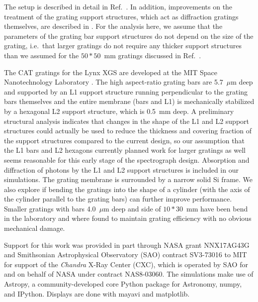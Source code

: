 \documentclass[]{spie}  %
\begin{document}
The setup is described in detail in Ref.~. In addition, improvements on the treatment of the grating support structures, which act as diffraction gratings themselves, are described in \cite{10.1117/12.2525814}. For the analysis here, we assume that the parameters of the grating bar support structures do not depend on the size of the grating, i.e.\ that larger gratings do not require any thicker support structures than we assumed for the $50*50$~mm gratings discussed in Ref.~.

The CAT gratings for the Lynx XGS are developed at the
MIT Space Nanotechnology Laboratory
\cite{Heilmann:11,doi:10.1117/12.2188525,10.1117/12.2314180,10.1117/12.2529354}. The high aspect-ratio grating bars are
5.7~$\mu$m deep and supported by an L1 support structure running
perpendicular to the grating bars themselves and the entire membrane
(bars and L1) is mechanically stabilized by a hexagonal L2 support
structure, which is 0.5~mm deep. 
A preliminary structural analysis indicates that changes in the shape of the L1 and L2 support structures could actually be used to reduce the thickness and covering fraction of the support structures compared to the current design, so our assumption that the L1 bars and L2 hexagons currently planned work for larger gratings as well seems reasonable for this early stage of the spectrograph design.
Absorption and diffraction of photons
by the L1 and L2 support structures is included in our
simulations. The grating membrane is surrounded by a narrow solid Si frame. We also explore if bending the gratings into the shape of a cylinder (with the axis of the cylinder parallel to the grating bars) can further improve performance. Smaller gratings with bars 4.0~$\mu$m deep and side of $10 * 30$~mm have been bend in the laboratory and where found to maintain grating efficiency with no obvious mechanical damage\cite{10.1117/12.2274205}.


\acknowledgments %
Support
for this work was provided in part through NASA grant NNX17AG43G and
Smithsonian Astrophysical Observatory (SAO) contract SV3-73016 to MIT
for support of the {\em Chandra} X-Ray Center (CXC), which is operated
by SAO for and on behalf of NASA under contract NAS8-03060.  The
simulations make use of Astropy, a community-developed core Python
package for Astronomy\cite{astropy1,astropy2}, numpy\cite{numpy}, and
IPython\cite{IPython}. Displays are done with mayavi\cite{mayavi} and
matplotlib\cite{matplotlib}.


\end{document}
